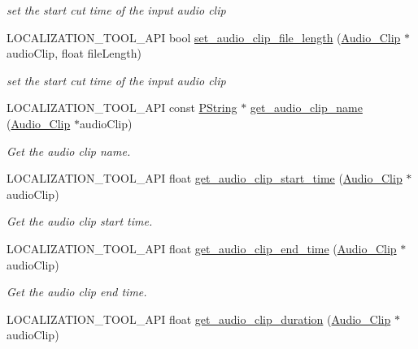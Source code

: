 \begin{DoxyCompactItemize}
\begin{DoxyCompactList}\small\item\em set the start cut time of the input audio clip \end{DoxyCompactList}\item 
L\+O\+C\+A\+L\+I\+Z\+A\+T\+I\+O\+N\+\_\+\+T\+O\+O\+L\+\_\+\+A\+PI bool \mbox{\hyperlink{namespaceprz_a9722a82e0324e8ddf5fa0923298a8797}{set\+\_\+audio\+\_\+clip\+\_\+file\+\_\+length}} (\mbox{\hyperlink{classprz_1_1_audio___clip}{Audio\+\_\+\+Clip}} $\ast$audio\+Clip, float file\+Length)
\begin{DoxyCompactList}\small\item\em set the start cut time of the input audio clip \end{DoxyCompactList}\item 
L\+O\+C\+A\+L\+I\+Z\+A\+T\+I\+O\+N\+\_\+\+T\+O\+O\+L\+\_\+\+A\+PI const \mbox{\hyperlink{classprz_1_1_p_string}{P\+String}} $\ast$ \mbox{\hyperlink{namespaceprz_a34ace91843bd282282f609752f6ba309}{get\+\_\+audio\+\_\+clip\+\_\+name}} (\mbox{\hyperlink{classprz_1_1_audio___clip}{Audio\+\_\+\+Clip}} $\ast$audio\+Clip)
\begin{DoxyCompactList}\small\item\em Get the audio clip name. \end{DoxyCompactList}\item 
L\+O\+C\+A\+L\+I\+Z\+A\+T\+I\+O\+N\+\_\+\+T\+O\+O\+L\+\_\+\+A\+PI float \mbox{\hyperlink{namespaceprz_ae887fdd042262bc94a29ad81d9737093}{get\+\_\+audio\+\_\+clip\+\_\+start\+\_\+time}} (\mbox{\hyperlink{classprz_1_1_audio___clip}{Audio\+\_\+\+Clip}} $\ast$audio\+Clip)
\begin{DoxyCompactList}\small\item\em Get the audio clip start time. \end{DoxyCompactList}\item 
L\+O\+C\+A\+L\+I\+Z\+A\+T\+I\+O\+N\+\_\+\+T\+O\+O\+L\+\_\+\+A\+PI float \mbox{\hyperlink{namespaceprz_ab424e7684c53c76bd12b24e549df8d32}{get\+\_\+audio\+\_\+clip\+\_\+end\+\_\+time}} (\mbox{\hyperlink{classprz_1_1_audio___clip}{Audio\+\_\+\+Clip}} $\ast$audio\+Clip)
\begin{DoxyCompactList}\small\item\em Get the audio clip end time. \end{DoxyCompactList}\item 
L\+O\+C\+A\+L\+I\+Z\+A\+T\+I\+O\+N\+\_\+\+T\+O\+O\+L\+\_\+\+A\+PI float \mbox{\hyperlink{namespaceprz_adf1775cc377a8c1a6b92ba0e648d98f1}{get\+\_\+audio\+\_\+clip\+\_\+duration}} (\mbox{\hyperlink{classprz_1_1_audio___clip}{Audio\+\_\+\+Clip}} $\ast$audio\+Clip)

\end{DoxyCompactItemize}

